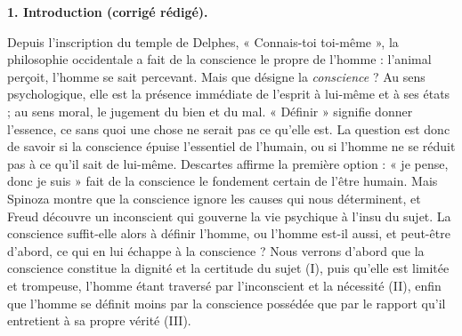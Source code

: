 \documentclass[11pt]{article}
\begin{document}
\begin{corrige}
\textbf{1. Introduction (corrigé rédigé).}

Depuis l'inscription du temple de Delphes, « Connais-toi toi-même », la philosophie occidentale a fait de la conscience le propre de l'homme : l'animal perçoit, l'homme se sait percevant. Mais que désigne la \emph{conscience} ? Au sens psychologique, elle est la présence immédiate de l'esprit à lui-même et à ses états ; au sens moral, le jugement du bien et du mal. « Définir » signifie donner l'essence, ce sans quoi une chose ne serait pas ce qu'elle est. La question est donc de savoir si la conscience épuise l'essentiel de l'humain, ou si l'homme ne se réduit pas à ce qu'il sait de lui-même. Descartes affirme la première option : « je pense, donc je suis » fait de la conscience le fondement certain de l'être humain. Mais Spinoza montre que la conscience ignore les causes qui nous déterminent, et Freud découvre un inconscient qui gouverne la vie psychique à l'insu du sujet. La conscience suffit-elle alors à définir l'homme, ou l'homme est-il aussi, et peut-être d'abord, ce qui en lui échappe à la conscience ? Nous verrons d'abord que la conscience constitue la dignité et la certitude du sujet (I), puis qu'elle est limitée et trompeuse, l'homme étant traversé par l'inconscient et la nécessité (II), enfin que l'homme se définit moins par la conscience possédée que par le rapport qu'il entretient à sa propre vérité (III).


\end{corrige}
\end{document}
